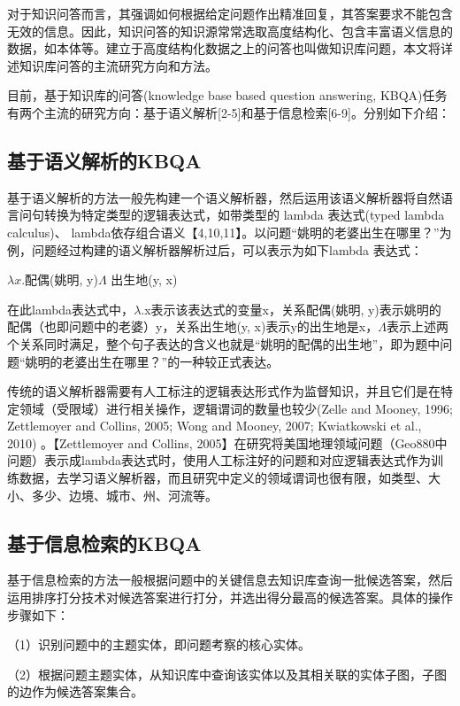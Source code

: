 对于知识问答而言，其强调如何根据给定问题作出精准回复，其答案要求不能包含无效的信息。因此，知识问答的知识源常常选取高度结构化、包含丰富语义信息的数据，如本体等。建立于高度结构化数据之上的问答也叫做知识库问题，本文将详述知识库问答的主流研究方向和方法。

目前，基于知识库的问答(knowledge base based question answering, KBQA)任务有两个主流的研究方向：基于语义解析[2-5]和基于信息检索[6-9]。分别如下介绍：

\subsection{基于语义解析的KBQA}
基于语义解析的方法一般先构建一个语义解析器，然后运用该语义解析器将自然语言问句转换为特定类型的逻辑表达式，如带类型的 lambda 表达式(typed lambda calculus)、 lambda依存组合语义【4,10,11】。以问题“姚明的老婆出生在哪里？”为例，问题经过构建的语义解析器解析过后，可以表示为如下lambda 表达式：
\begin{center}
$\lambda x.$配偶(姚明, y)\space$\Lambda$ 出生地(y, x)
\end{center}

在此lambda表达式中，$\lambda$.x表示该表达式的变量x，关系配偶(姚明, y)表示姚明的配偶（也即问题中的老婆）y，关系出生地(y, x)表示y的出生地是x，$\Lambda$表示上述两个关系同时满足，整个句子表达的含义也就是“姚明的配偶的出生地”，即为题中问题“姚明的老婆出生在哪里？”的一种较正式表达。

传统的语义解析器需要有人工标注的逻辑表达形式作为监督知识，并且它们是在特定领域（受限域）进行相关操作，逻辑谓词的数量也较少(Zelle and Mooney, 1996; Zettlemoyer and Collins, 2005; Wong and Mooney, 2007;
Kwiatkowski et al., 2010) 。【Zettlemoyer and Collins, 2005】在研究将美国地理领域问题（Geo880中问题）表示成lambda表达式时，使用人工标注好的问题和对应逻辑表达式作为训练数据，去学习语义解析器，而且研究中定义的领域谓词也很有限，如类型、大小、多少、边境、城市、州、河流等。

\subsection{基于信息检索的KBQA}
基于信息检索的方法一般根据问题中的关键信息去知识库查询一批候选答案，然后运用排序打分技术对候选答案进行打分，并选出得分最高的候选答案。具体的操作步骤如下：

（1）识别问题中的主题实体，即问题考察的核心实体。

（2）根据问题主题实体，从知识库中查询该实体以及其相关联的实体子图，子图的边作为候选答案集合。

